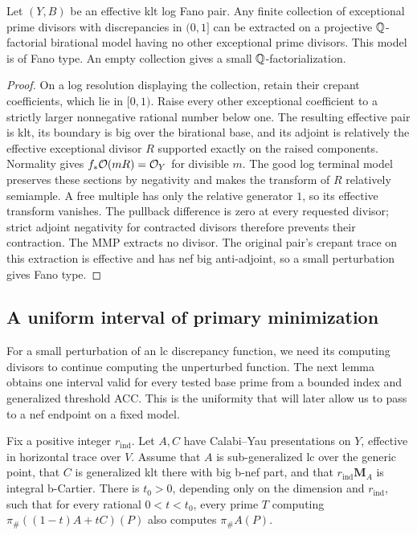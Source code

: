 \begin{lemma}\label{b:controlled-extraction}
Let \((Y,B)\) be an effective klt log Fano pair. Any finite collection
of exceptional prime divisors with discrepancies in \((0,1]\) can be
extracted on a projective \(\mathbb Q\)-factorial birational model having no
other exceptional prime divisors. This model is of Fano type.
An empty collection gives a small \(\mathbb Q\)-factorialization.
\end{lemma}

\begin{proof}
On a log resolution displaying the collection, retain their crepant
coefficients, which lie in \([0,1)\). Raise every other exceptional
coefficient to a strictly larger nonnegative rational number below
one. The resulting effective pair is klt, its boundary is big over
the birational base, and its adjoint is relatively the effective
exceptional divisor \(R\) supported exactly on the raised components.
Normality gives \(f_*\mathcal O(mR)=\mathcal O_Y\) for divisible \(m\).
The good log terminal model preserves these sections by negativity
and makes the transform of \(R\) relatively semiample. A free multiple
has only the relative generator \(1\), so its effective transform
vanishes. The pullback difference is zero at every requested divisor;
strict adjoint negativity for contracted divisors therefore prevents
their contraction. The MMP extracts no divisor. The original pair's
crepant trace on this extraction is effective and has nef big
anti-adjoint, so a small perturbation gives Fano type.
\end{proof}

\subsection{A uniform interval of primary minimization}

For a small perturbation of an lc discrepancy function, we need its
computing divisors to continue computing the unperturbed function. The
next lemma obtains one interval valid for every tested base prime from a
bounded index and generalized threshold ACC. This is the uniformity that
will later allow us to pass to a nef endpoint on a fixed model.

\begin{lemma}\label{b:primary-minimization}
Fix a positive integer \(r_{\mathrm{ind}}\). Let \(A,C\) have Calabi--Yau presentations on \(Y\), effective in
horizontal trace over \(V\). Assume that \(A\) is sub-generalized lc
over the generic point, that \(C\) is generalized klt there with big
b-nef part, and that \(r_{\mathrm{ind}}\mathbf M_A\) is integral b-Cartier.
There is \(t_0>0\), depending only on the dimension and \(r_{\mathrm{ind}}\), such
that for every rational \(0<t<t_0\), every prime \(T\) computing
\(\pi_\#((1-t)A+tC)(P)\) also computes \(\pi_\#A(P)\).
\end{lemma}

